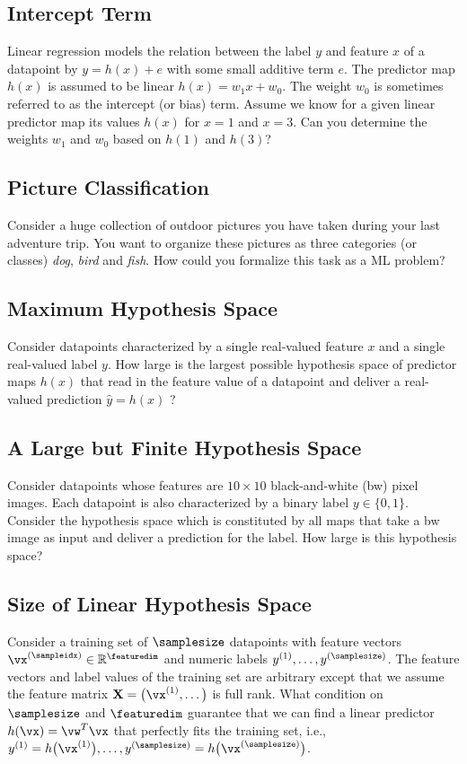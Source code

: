 \documentclass[12pt]{report}
\newcommand{\featurelen}{\featuredim}
\begin{document}
 \subsection{Intercept Term}
 \label{ex_2_5}
 Linear regression models the relation between the label $y$ and feature $x$ of 
 a datapoint by $y = h(x) + e$ with some small additive term $e$. The predictor 
 map $h(x)$ is assumed to be linear $h(x) =w_1 x + w_0$. The weight $w_{0}$ is 
 sometimes referred to as the intercept (or bias) term. Assume we know for a given 
 linear predictor map its values $h(x)$ for $x=1$ and $x=3$. Can you determine 
 the weights $w_{1}$ and $w_{0}$ based on $h(1)$ and $h(3)$?
 
 \subsection{Picture Classification} 
 \label{ex_2_6}
Consider a huge collection of outdoor pictures you have taken during 
your last adventure trip. You want to organize these pictures as three 
categories (or classes) \emph{dog}, \emph{bird} and \emph{fish}. How 
could you formalize this task as a ML problem? 

 \subsection{Maximum Hypothesis Space} 
\label{ex_2_7}
Consider datapoints characterized by a single real-valued 
feature $x$ and a single real-valued label $y$. How large 
is the largest possible hypothesis space of predictor maps 
$h(x)$ that read in the feature value of a datapoint and 
deliver a real-valued prediction $\hat{y}=h(x)$ ? 

 \subsection{A Large but Finite Hypothesis Space} 
\label{ex_2_8}
Consider datapoints whose features are $10 \times 10$ 
black-and-white (bw) pixel images. Each datapoint is also 
characterized by a binary label $y \in \{0,1\}$. Consider the 
hypothesis space which is constituted by all maps that take 
a bw image as input and deliver a prediction for the label. 
How large is this hypothesis space? 

\subsection{Size of Linear Hypothesis Space} 
\label{ex_size_lin_hypospace} 
Consider a training set of $\samplesize$ datapoints with feature 
vectors $\vx^{(\sampleidx)} \in \mathbb{R}^{\featuredim}$ and 
numeric labels $y^{(1)},\ldots,y^{(\samplesize)}$. The feature vectors 
and label values of the training set are arbitrary except that we assume 
the feature matrix $\mathbf{X} = \big(\vx^{(1)},\ldots \big)$ is full rank. 
What condition on $\samplesize$ and $\featurelen$ guarantee that we 
can find a linear predictor $h(\vx) = \vw^{T} \vx$ that perfectly fits the 
training set, i.e., $y^{(1)} = h\big(\vx^{(1)} \big),\ldots, y^{(\samplesize)} = h\big(\vx^{(\samplesize)} \big)$. 
\end{document}
